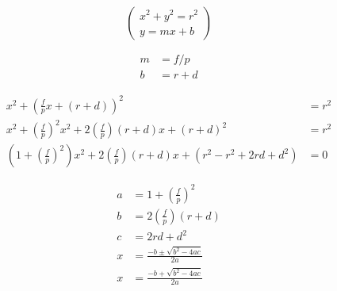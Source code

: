 \documentclass{article}
\begin{document}
\[ %
\begin{pmatrix}
x^2 + y^2 = r^2 \\
y = mx + b
\end{pmatrix}
\]

\[ %
\begin{aligned}
m &= f/p \\
b &= r + d
\end{aligned}
\]

\[ %
\begin{aligned}
x^2 + \left(\frac{f}{p}x + (r + d)\right)^2 &= r^2 \\
x^2 + \left(\frac{f}{p}\right)^2 x^2 + 2\left(\frac{f}{p}\right)(r + d)x +
  (r + d)^2 &= r^2 \\
\left(1 + \left(\frac{f}{p}\right)^2\right)x^2 +
  2\left(\frac{f}{p}\right)(r + d)x +
  (r^2 - r^2 + 2rd + d^2) &= 0
\end{aligned}
\]

\[ %
\begin{aligned}
a &= 1 + \left(\frac{f}{p}\right)^2 \\
b &= 2\left(\frac{f}{p}\right)(r + d) \\
c &= 2rd + d^2 \\
x &= \frac{-b \pm \sqrt{b^2 - 4ac}}{2a} \\
x &= \frac{-b + \sqrt{b^2 - 4ac}}{2a}
\end{aligned}
\]
\end{document}
